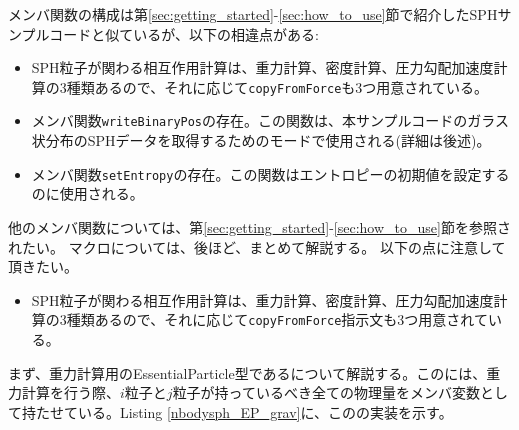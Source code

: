 \ifCpp %
メンバ関数の構成は第\ref{sec:getting_started}-\ref{sec:how_to_use}節で紹介したSPHサンプルコードと似ているが、以下の相違点がある:
\begin{itemize}[leftmargin=*,itemsep=-1ex]
\item SPH粒子が関わる相互作用計算は、重力計算、密度計算、圧力勾配加速度計算の3種類あるので、それに応じて\texttt{copyFromForce}も3つ用意されている。
\item メンバ関数\texttt{writeBinaryPos}の存在。この関数は、本サンプルコードのガラス状分布のSPHデータを取得するためのモードで使用される(詳細は後述)。
\item メンバ関数\texttt{setEntropy}の存在。この関数はエントロピーの初期値を設定するのに使用される。
\end{itemize}
他のメンバ関数については、第\ref{sec:getting_started}-\ref{sec:how_to_use}節を参照されたい。
マクロについては、後ほど、まとめて解説する。
\endifCpp
\ifIF %
以下の点に注意して頂きたい。
\begin{itemize}[leftmargin=*,itemsep=-1ex]
\item SPH粒子が関わる相互作用計算は、重力計算、密度計算、圧力勾配加速度計算の3種類あるので、それに応じて\texttt{copyFromForce}指示文も3つ用意されている。
\end{itemize}
\endifIF


\ifCpp %

\endifCpp
\ifFtn %

\endifFtn
\ifC %

\endifC

まず、重力計算用のEssentialParticle型であるについて解説する。この\structure には、重力計算を行う際、$i$粒子と$j$粒子が持っているべき全ての物理量をメンバ変数として持たせている。Listing \ref{nbodysph_EP_grav}に、この\structure の実装を示す。

